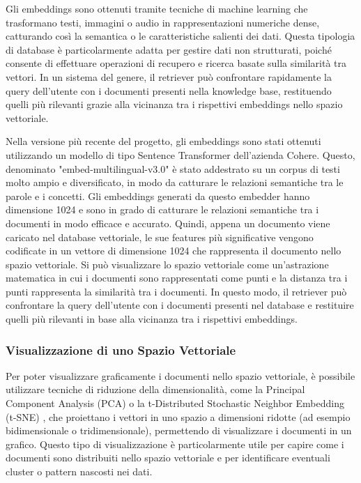 Gli embeddings sono ottenuti tramite tecniche di machine learning che trasformano testi, immagini o audio in rappresentazioni numeriche dense, catturando così la semantica o le caratteristiche salienti dei dati.
Questa tipologia di database è particolarmente adatta per gestire dati non strutturati, poiché consente di effettuare operazioni di recupero e ricerca basate sulla similarità tra vettori. In un sistema del genere, il retriever può confrontare rapidamente la query dell'utente con i documenti presenti nella knowledge base, restituendo quelli più rilevanti grazie alla vicinanza tra i rispettivi embeddings nello spazio vettoriale.

Nella versione più recente del progetto, gli embeddings sono stati ottenuti utilizzando un modello di tipo Sentence Transformer dell'azienda Cohere. Questo, denominato "embed-multilingual-v3.0" \cite{cohereembed} è stato addestrato su un corpus di testi molto ampio e diversificato, in modo da catturare le relazioni semantiche tra le parole e i concetti. Gli embeddings generati da questo embedder hanno dimensione 1024 e sono in grado di catturare le relazioni semantiche tra i documenti in modo efficace e accurato.
Quindi, appena un documento viene caricato nel database vettoriale, le sue features più significative vengono codificate in un vettore di dimensione 1024 che rappresenta il documento nello spazio vettoriale. Si può visualizzare lo spazio vettoriale come un'astrazione matematica in cui i documenti sono rappresentati come punti e la distanza tra i punti rappresenta la similarità tra i documenti. In questo modo, il retriever può confrontare la query dell'utente con i documenti presenti nel database e restituire quelli più rilevanti in base alla vicinanza tra i rispettivi embeddings.

\subsubsection{Visualizzazione di uno Spazio Vettoriale}
Per poter visualizzare graficamente i documenti nello spazio vettoriale, è possibile utilizzare tecniche di riduzione della dimensionalità, come la Principal Component Analysis (PCA) \cite{MACKIEWICZ1993303} o la t-Distributed Stochastic Neighbor Embedding (t-SNE) \cite{cai2022theoreticalfoundationstsnevisualizing,roy2024trustworthydimensionalityreduction}, che proiettano i vettori in uno spazio a dimensioni ridotte (ad esempio bidimensionale o tridimensionale), permettendo di visualizzare i documenti in un grafico.
Questo tipo di visualizzazione è particolarmente utile per capire come i documenti sono distribuiti nello spazio vettoriale e per identificare eventuali cluster o pattern nascosti nei dati.

